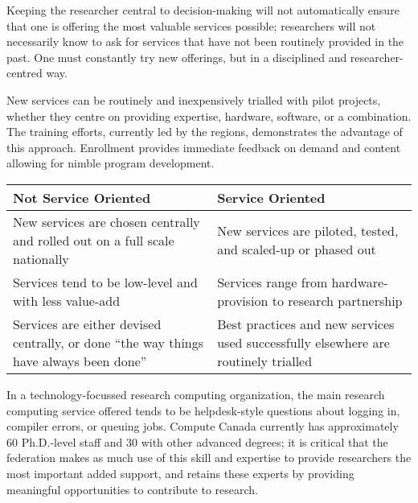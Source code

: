 \documentclass[11pt, letterpaper, twoside]{article}
\begin{document}
Keeping the researcher central to decision-making will not automatically
ensure that one is offering the most valuable services possible;
researchers will not necessarily know to ask for services that have not
been routinely provided in the past. One must constantly try new
offerings, but in a disciplined and researcher-centred way.


New services can be routinely and inexpensively trialled with pilot
projects, whether they centre on providing expertise, hardware,
software, or a combination. The training efforts, currently led by the
regions, demonstrates the advantage of this approach. Enrollment
provides immediate feedback on demand and content allowing for nimble
program development.

\begin{table}[ht]
\centering
\small {\sffamily
{}
\begin{tabular}{P{2.5in}|P{2.5in}}
\textcolor{cdaRed}{\textbf{Not Service Oriented}} & \textcolor{cdaRed}{\textbf{Service Oriented}} \\
\hline \hline 
New services are chosen centrally and rolled out on a full scale nationally & New services are piloted, tested, and scaled-up or phased out\\
Services tend to be low-level and with less value-add & Services range from hardware-provision to research partnership\\
Services are either devised centrally, or done \enquote{the way things have always been done} & Best practices and new services used successfully elsewhere are routinely trialled \\
\hline
\end{tabular}
}
\end{table}

In a technology-focussed research computing organization, the main
research computing service offered tends to be helpdesk-style questions
about logging in, compiler errors, or queuing jobs.  Compute Canada
currently has approximately 60 Ph.D.-level staff and 30 with other
advanced degrees; it is critical that the federation makes as much use
of this skill and expertise to provide researchers the most important
added support, and retains these experts by providing meaningful
opportunities to contribute to research.

\end{document}
